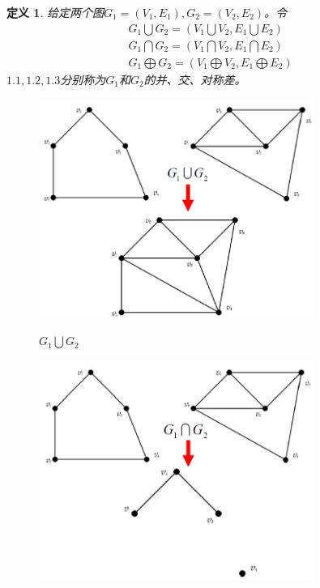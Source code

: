 \documentclass[11pt,a4paper,openany]{book}
\newtheorem{defination}{\textbf{定义}}[section]
\begin{document}
\begin{defination}
给定两个图$G_1=(V_1,E_1),G_2=(V_2,E_2)$。令
\begin{gather}
  G_1\bigcup G_2=(V_1\bigcup V_2,E_1\bigcup E_2) \\
  G_1\bigcap G_2=(V_1\bigcap V_2,E_1\bigcap E_2)\\
  G_1\bigoplus G_2=(V_1\bigoplus V_2,E_1\bigoplus E_2)
\end{gather}
$1.1,1.2,1.3 $分别称为$G_1$和$G_2$的\textcolor[rgb]{1.00,0.00,0.00}{并}、\textcolor[rgb]{1.00,0.00,0.00}{交}、\textcolor[rgb]{1.00,0.00,0.00}{对称差}。\\
\begin{figure}[H]
  \centering
  \includegraphics[width=0.8\textwidth]{1.6.1.png}\\
  \caption{$G_1\bigcup G_2$}
\end{figure}
\begin{figure}[H]
  \centering
  \includegraphics[width=0.8\textwidth]{1.6.2.png}\\

\end{figure}
\end{defination}
\end{document}
